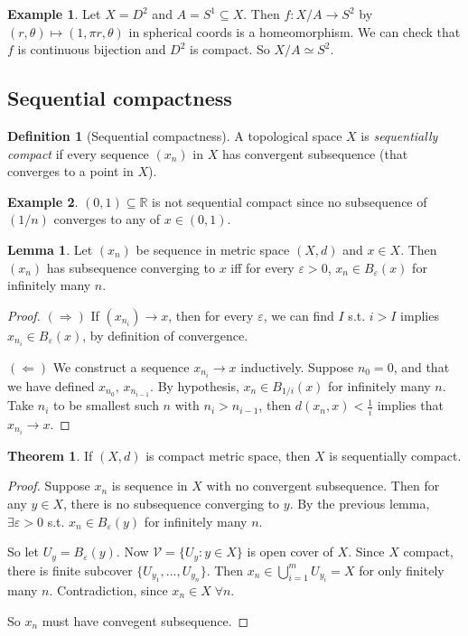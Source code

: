 \documentclass[a4paper,11pt]{article}
\theoremstyle{definition}
\newtheorem*{defn}{Definition}
\newtheorem*{ex}{Example}
\newtheorem*{thm}{Theorem}
\newtheorem*{lem}{Lemma}
\numberwithin{equation}{section}
\begin{document}
\begin{ex}
Let $X=D^2$ and $A=S^1\subseteq X$. Then $f:X/A\rightarrow S^2$ by $(r,\theta)\mapsto(1,\pi r,\theta)$ in spherical coords is a homeomorphism. We can check that $f$ is continuous bijection and $D^2$ is compact. So $X/A\simeq S^2$.
\end{ex}

\subsection{Sequential compactness}

\begin{defn}[Sequential compactness]
    A topological space $X$ is \emph{sequentially compact} if every sequence $(x_n)$ in $X$ has convergent subsequence (that converges to a point in $X$).
\end{defn}

\begin{ex}
$(0,1)\subseteq\mathbb{R}$ is not sequential compact since no subsequence of $(1/n)$ converges to any of $x\in(0,1)$.
\end{ex}

\begin{lem}
    Let $(x_n)$ be sequence in metric space $(X,d)$ and $x\in X$. Then $(x_n)$ has subsequence converging to $x$ iff for every $\varepsilon>0$, $x_n\in B_\varepsilon(x)$ for infinitely many $n$.
\end{lem}

\begin{proof}
    $(\Rightarrow)$ If $(x_{n_i})\rightarrow x$, then for every $\varepsilon$, we can find $I$ s.t. $i>I$ implies $x_{n_i}\in B_\varepsilon(x)$, by definition of convergence.
    
    $(\Leftarrow)$ We construct a sequence $x_{n_i}\rightarrow x$ inductively. Suppose $n_0=0$, and that we have defined $x_{n_0}$, $x_{n_{i-1}}$. By hypothesis, $x_n\in B_{1/i}(x)$ for infinitely many $n$. Take $n_i$ to be smallest such $n$ with $n_i>n_{i-1}$, then $d(x_n,x)<\frac{1}{i}$ implies that $x_{n_i}\rightarrow x$.
\end{proof}

\begin{thm}
If $(X,d)$ is compact metric space, then $X$ is sequentially compact.
\end{thm}

\begin{proof}
    Suppose $x_n$ is sequence in $X$ with no convergent subsequence. Then for any $y\in X$, there is no subsequence converging to $y$. By the previous lemma, $\exists\varepsilon>0$ s.t. $x_n\in B_\varepsilon(y)$ for infinitely many $n$.
    
    So let $U_y=B_\varepsilon(y)$. Now $\mathcal{V}=\{U_y:y\in X\}$ is open cover of $X$. Since $X$ compact, there is finite subcover $\{U_{y_1},...,U_{y_n}\}$. Then $x_n\in\bigcup_{i=1}^mU_{y_i}=X$  for only finitely many $n$. Contradiction, since $x_n\in X\;\forall n$.
    
    So $x_n$ must have convegent subsequence.
\end{proof}
\end{document}
